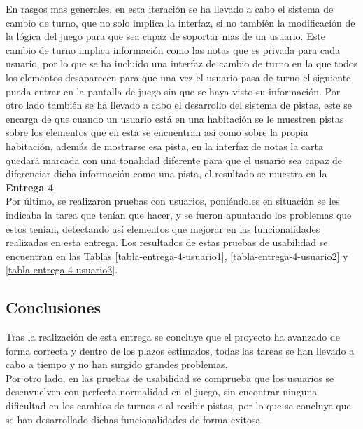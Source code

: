 En rasgos mas generales, en esta iteración se ha llevado a cabo el sistema de cambio de turno, que no solo implica la interfaz, si no también la modificación de la lógica del juego para que sea capaz de soportar mas de un usuario. Este cambio de turno implica información como las notas que es privada para cada usuario, por lo que se ha incluido una interfaz de cambio de turno en la que todos los elementos desaparecen para que una vez el usuario pasa de turno el siguiente pueda entrar en la pantalla de juego sin que se haya visto su información. Por otro lado también se ha llevado a cabo el desarrollo del sistema de pistas, este se encarga de que cuando un usuario está en una habitación se le muestren pistas sobre los elementos que en esta se encuentran así como sobre la propia habitación, además de mostrarse esa pista, en la interfaz de notas la carta quedará marcada con una tonalidad diferente para que el usuario sea capaz de diferenciar dicha información como una pista, el resultado se muestra en la \textbf{Entrega 4}.\\

Por último, se realizaron pruebas con usuarios, poniéndoles en situación se les indicaba la tarea que tenían que hacer, y se fueron apuntando los problemas que estos tenían, detectando así elementos que mejorar en las funcionalidades realizadas en esta entrega. Los resultados de estas pruebas de usabilidad se encuentran en las Tablas \ref{tabla-entrega-4-usuario1}, \ref{tabla-entrega-4-usuario2} y \ref{tabla-entrega-4-usuario3}.


\subsection{Conclusiones}
Tras la realización de esta entrega se concluye que el proyecto ha avanzado de forma correcta y dentro de los plazos estimados, todas las tareas se han llevado a cabo a tiempo y no han surgido grandes problemas.\\

Por otro lado, en las pruebas de usabilidad se comprueba que los usuarios se desenvuelven con perfecta normalidad en el juego, sin encontrar ninguna dificultad en los cambios de turnos o al recibir pistas, por lo que se concluye que se han desarrollado dichas funcionalidades de forma exitosa.
